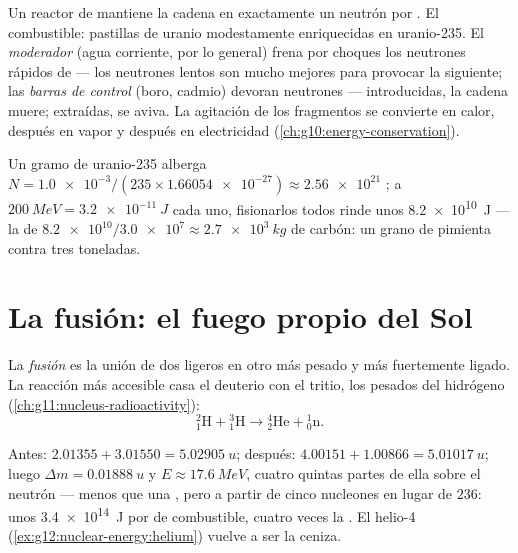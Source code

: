 \begin{definition}\label{def:g12:nuclear-energy:reactor}
Un reactor de  mantiene la cadena en exactamente un neutrón por . El
combustible: pastillas de uranio modestamente enriquecidas en uranio-235. El
\emph{moderador} (agua corriente, por lo general) frena por choques
los neutrones rápidos de  --- los neutrones lentos son mucho mejores para
provocar la  siguiente; las \emph{barras de control}
(boro, cadmio) devoran neutrones --- introducidas, la cadena muere; extraídas, se
aviva. La agitación de los fragmentos se convierte en calor, después en vapor y
después en electricidad (\cref{ch:g10:energy-conservation}).
\end{definition}

\begin{example}\label{ex:g12:nuclear-energy:gram}
Un gramo de uranio-235 alberga
$N = \num{1.0e-3} / (235 \times \num{1.66054e-27}) \approx \num{2.56e21}$ ; a
$\qty{200}{MeV} = \qty{3.2e-11}{J}$ cada uno, fisionarlos todos rinde unos
\qty{8.2e10}{J} --- la  de
$\num{8.2e10} / \num{3.0e7} \approx \qty{2.7e3}{kg}$ de carbón: un grano de pimienta
contra tres toneladas.
\end{example}

\section{La fusión: el fuego propio del Sol}

\begin{definition}[Fusión]\label{def:g12:nuclear-energy:fusion}
La \emph{fusión} es la unión de dos  ligeros en otro más pesado y
más fuertemente ligado. La reacción más accesible casa el deuterio con el tritio, los
 pesados del hidrógeno (\cref{ch:g11:nucleus-radioactivity}):
\[
{}^{2}_{1}\mathrm{H} + {}^{3}_{1}\mathrm{H} \longrightarrow
{}^{4}_{2}\mathrm{He} + {}^{1}_{0}\mathrm{n}.
\]
\end{definition}

\begin{example}[D--T, pesada]\label{ex:g12:nuclear-energy:dt}
Antes: $2.01355 + 3.01550 = \qty{5.02905}{u}$; después:
$4.00151 + 1.00866 = \qty{5.01017}{u}$; luego $\Delta m = \qty{0.01888}{u}$ y
$E \approx \qty{17.6}{MeV}$, cuatro quintas partes de ella sobre el neutrón --- menos
que una , pero a partir de cinco nucleones en lugar de $236$: unos
\qty{3.4e14}{J} por  de combustible, cuatro veces la . El helio-4
(\cref{ex:g12:nuclear-energy:helium}) vuelve a ser la ceniza.
\end{example}

